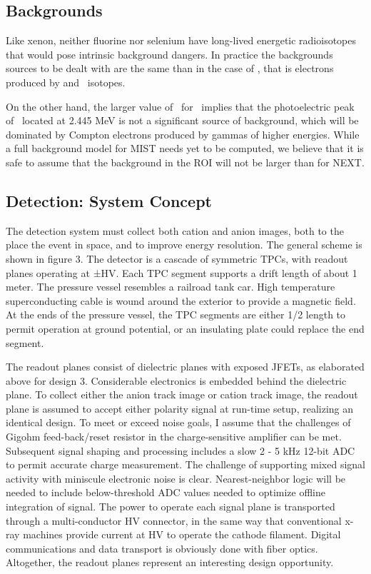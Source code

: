 \subsection{Backgrounds}
Like xenon, neither   
fluorine nor selenium have  long-lived energetic radioisotopes that would pose intrinsic background dangers. In practice the backgrounds sources to be dealt with are the same than in the case of \XE, that is electrons produced by \BI and \TL\  isotopes.  

On the other hand, the larger value of \Qbb\ for \SE\ implies that the photoelectric peak of \BI\ located at 2.445 MeV is not a significant source of background, which will be dominated by Compton electrons produced by gammas of higher energies. While a full background model for MIST needs yet to be computed, we believe that it is safe to assume that the background in the ROI will not be larger than for NEXT.   

\subsection{Detection: System Concept}

The detection system must collect both cation and anion images, both to the place the event in space, and to improve energy resolution.  The general scheme is shown in figure 3.  The detector is a cascade of symmetric TPCs, with readout planes operating at ±HV. Each TPC segment supports a drift length of about 1 meter.  The pressure vessel resembles a railroad tank car.  High temperature superconducting cable is wound around the exterior to provide a magnetic field.   At the ends of the pressure vessel, the TPC segments are either 1/2 length to permit operation at ground potential, or an insulating plate could replace the end segment.

The readout planes consist of dielectric planes with exposed JFETs, as elaborated above for design 3.  Considerable electronics is embedded behind the dielectric plane. To collect either the anion track image or cation track image, the readout plane is assumed to accept either polarity signal at run-time setup, realizing an identical design.  To meet or exceed noise goals, I assume that the challenges of Gigohm feed-back/reset resistor in the charge-sensitive amplifier can be met.  Subsequent signal shaping and processing includes a slow 2 - 5 kHz 12-bit ADC to permit accurate charge measurement.  The challenge of supporting mixed signal activity with miniscule electronic noise is clear.  Nearest-neighbor logic will be needed to include below-threshold ADC values needed to optimize offline integration of signal.  The power to operate each signal plane is transported through a multi-conductor HV connector, in the same way that conventional x-ray machines provide current at HV to operate the cathode filament. Digital communications and data transport is obviously done with fiber optics.  Altogether, the readout planes represent an interesting design opportunity. 

